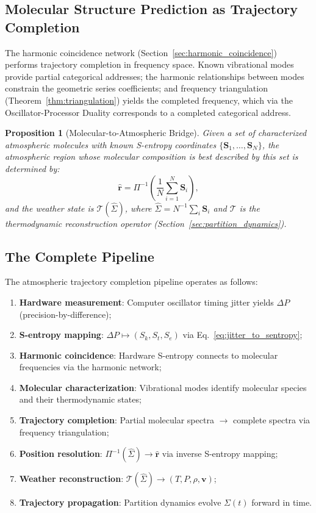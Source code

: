 \documentclass[twocolumn,10pt]{article}
\newtheorem{proposition}[theorem]{Proposition}
\theoremstyle{definition}
\newcommand{\Sentropy}{\mathbf{S}}
\newcommand{\Sk}{S_k}
\newcommand{\St}{S_t}
\newcommand{\Se}{S_e}
\begin{document}
\subsection{Molecular Structure Prediction as Trajectory Completion}

The harmonic coincidence network (Section~\ref{sec:harmonic_coincidence}) performs trajectory completion in frequency space. Known vibrational modes provide partial categorical addresses; the harmonic relationships between modes constrain the geometric series coefficients; and frequency triangulation (Theorem~\ref{thm:triangulation}) yields the completed frequency, which via the Oscillator-Processor Duality corresponds to a completed categorical address.

\begin{proposition}[Molecular-to-Atmospheric Bridge]\label{prop:mol_atm_bridge}
Given a set of characterized atmospheric molecules with known S-entropy coordinates $\{\Sentropy_1, \ldots, \Sentropy_N\}$, the atmospheric region whose molecular composition is best described by this set is determined by:
\begin{equation}\label{eq:mol_atm}
    \hat{\mathbf{r}} = \Pi^{-1}\left(\frac{1}{N}\sum_{i=1}^{N} \Sentropy_i\right),
\end{equation}
and the weather state is $\mathcal{T}(\hat{\Sigma})$, where $\hat{\Sigma} = N^{-1}\sum_i \Sentropy_i$ and $\mathcal{T}$ is the thermodynamic reconstruction operator (Section~\ref{sec:partition_dynamics}).
\end{proposition}

\subsection{The Complete Pipeline}

The atmospheric trajectory completion pipeline operates as follows:
\begin{enumerate}[nosep]
    \item \textbf{Hardware measurement}: Computer oscillator timing jitter yields $\Delta P$ (precision-by-difference);
    \item \textbf{S-entropy mapping}: $\Delta P \mapsto (\Sk, \St, \Se)$ via Eq.~\eqref{eq:jitter_to_sentropy};
    \item \textbf{Harmonic coincidence}: Hardware S-entropy connects to molecular frequencies via the harmonic network;
    \item \textbf{Molecular characterization}: Vibrational modes identify molecular species and their thermodynamic states;
    \item \textbf{Trajectory completion}: Partial molecular spectra $\to$ complete spectra via frequency triangulation;
    \item \textbf{Position resolution}: $\Pi^{-1}(\hat{\Sigma}) \to \hat{\mathbf{r}}$ via inverse S-entropy mapping;
    \item \textbf{Weather reconstruction}: $\mathcal{T}(\hat{\Sigma}) \to (T, P, \rho, \mathbf{v})$;
    \item \textbf{Trajectory propagation}: Partition dynamics evolve $\Sigma(t)$ forward in time.
\end{enumerate}
\end{document}
